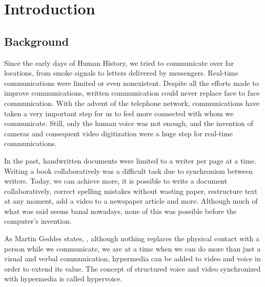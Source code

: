 \chapter{Introduction}
\label{chapter:introduction}

\section{Background}
\label{section:background}

	Since the early days of Human History, we tried to communicate over far locations, from smoke signals to letters delivered by messengers. Real-time communications were limited or even nonexistent. Despite all the efforts made to improve communications, written communication could never replace face to face communication.
	With the advent of the telephone network, communications have taken a very important step for us to feel more connected with whom we communicate. Still, only the human voice was not enough, and the invention of cameras and consequent video digitization were a huge step for real-time communications.

	In the past, handwritten documents were limited to a writer per page at a time. Writing a book collaboratively was a difficult task due to synchronism between writers.
	Today, we can achieve more, it is possible to write a document collaboratively, correct spelling mistakes without wasting paper, restructure text at any moment, add a video to a newspaper article and more. Although much of what was said seems banal nowadays, none of this was possible before the computer's invention. 

	As Martin Geddes states\cite{geddes},  , although nothing replaces the physical contact with a person while we communicate, we are at a time when we can do more than just a visual and verbal communication, hypermedia can be added to video and voice in order to extend its value. The concept of structured voice and video synchronized with hypermedia is called hypervoice\cite{geddes}.


